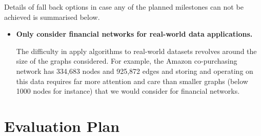 \documentclass[12pt]{article}
\numberwithin{equation}{section}
\begin{document}
Details of fall back options in case any of the planned milestones can not be achieved is summarised below.
\begin{itemize}
	\item \textbf{Only consider financial networks for real-world data applications.}

	The difficulty in apply algorithms to real-world datasets revolves around the size of the graphs considered. For example, the Amazon co-purchasing network has 334,683 nodes and 925,872 edges and storing and operating on this data requires far more attention and care than smaller graphs (below 1000 nodes for instance) that we would consider for financial networks.
\end{itemize}


\newpage
\thispagestyle{plain}
\mbox{}
\section {Evaluation Plan}
\label{sec:evaluationPlan}


\newpage
\thispagestyle{plain}
\mbox{}



\end{document}
